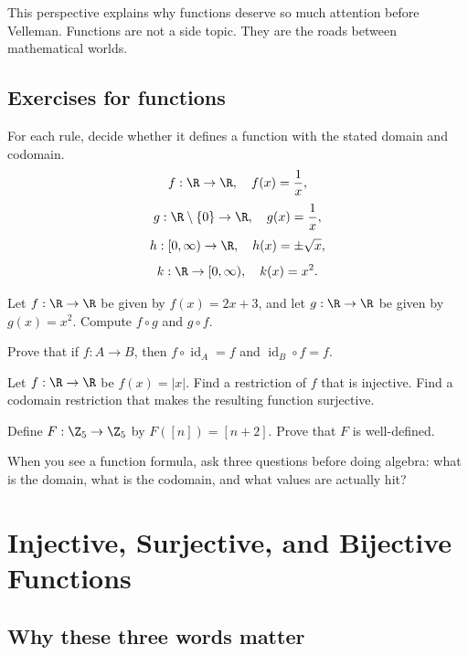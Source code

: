 This perspective explains why functions deserve so much attention before Velleman. Functions are not a side topic. They are the roads between mathematical worlds.

\subsection{Exercises for functions}

\begin{exercise}
For each rule, decide whether it defines a function with the stated domain and codomain.
\[
f:\R\to\R,\quad f(x)=\frac1x,
\]
\[
g:\R\setminus\{0\}\to\R,\quad g(x)=\frac1x,
\]
\[
h:[0,\infty)\to\R,\quad h(x)=\pm\sqrt{x},
\]
\[
k:\R\to[0,\infty),\quad k(x)=x^2.
\]
\end{exercise}

\begin{exercise}
Let $f:\R\to\R$ be given by $f(x)=2x+3$, and let $g:\R\to\R$ be given by $g(x)=x^2$. Compute $f\circ g$ and $g\circ f$.
\end{exercise}

\begin{exercise}
Prove that if $f:A\to B$, then $f\circ\operatorname{id}_A=f$ and $\operatorname{id}_B\circ f=f$.
\end{exercise}

\begin{exercise}
Let $f:\R\to\R$ be $f(x)=|x|$. Find a restriction of $f$ that is injective. Find a codomain restriction that makes the resulting function surjective.
\end{exercise}

\begin{exercise}
Define $F:\Z_5\to\Z_5$ by $F([n])=[n+2]$. Prove that $F$ is well-defined.
\end{exercise}

\begin{walkbox}
When you see a function formula, ask three questions before doing algebra: what is the domain, what is the codomain, and what values are actually hit?
\end{walkbox}

\section{Injective, Surjective, and Bijective Functions}

\subsection{Why these three words matter}

